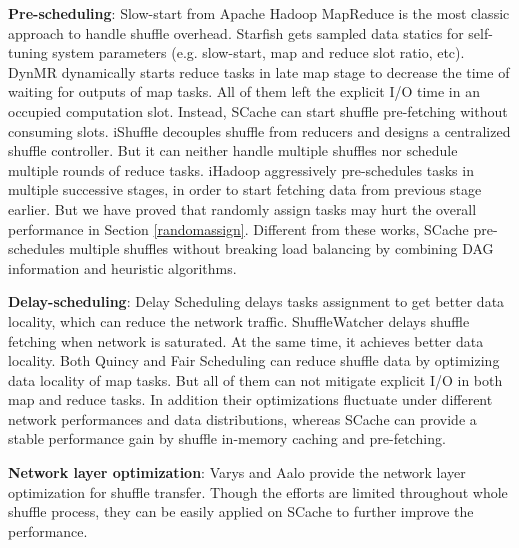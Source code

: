 \textbf{Pre-scheduling}: Slow-start from Apache Hadoop MapReduce is the most classic approach to handle shuffle overhead. Starfish \cite{starfish} gets sampled data statics for self-tuning system parameters (e.g. slow-start, map and reduce slot ratio, etc). DynMR \cite{dynmr} dynamically starts reduce tasks in late map stage to decrease the time of waiting for outputs of map tasks. All of them left the explicit I/O time in an occupied computation slot. Instead, SCache can start shuffle pre-fetching without consuming slots. iShuffle \cite{ishuffle} decouples shuffle from reducers and designs a centralized shuffle controller. But it can neither handle multiple shuffles nor schedule multiple rounds of reduce tasks. iHadoop \cite{ihadoop} aggressively pre-schedules tasks in multiple successive stages, in order to start fetching data from previous stage earlier. But we have proved that randomly assign tasks may hurt the overall performance in Section \ref{randomassign}. Different from these works, SCache pre-schedules multiple shuffles without breaking load balancing by combining DAG information and heuristic algorithms.

\textbf{Delay-scheduling}: Delay Scheduling \cite{delay} delays tasks assignment to get better data locality, which can reduce the network traffic. ShuffleWatcher \cite{shufflewatcher} delays shuffle fetching when network is saturated. At the same time, it achieves better data locality. Both Quincy \cite{quincy} and Fair Scheduling \cite{preemptive} can reduce shuffle data by optimizing data locality of map tasks. But all of them can not mitigate explicit I/O in both map and reduce tasks. In addition their optimizations fluctuate under different network performances and data distributions, whereas SCache can provide a stable performance gain by shuffle in-memory caching and pre-fetching.

\textbf{Network layer optimization}: Varys \cite{varys} and Aalo \cite{aalo} provide the network layer optimization for shuffle transfer. Though the efforts are limited throughout whole shuffle process, they can be easily applied on SCache to further improve the performance.